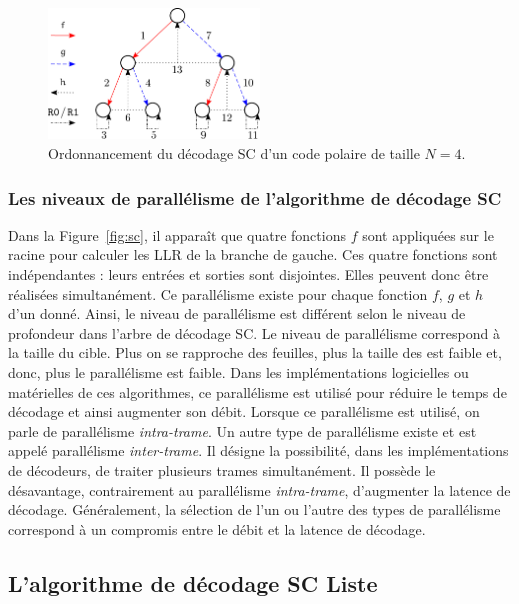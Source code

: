 \begin{figure}[t]
\centering
\includegraphics[width=0.5\textwidth]{main/ch1_fig/seq_sc}
\caption{Ordonnancement du décodage SC d'un code polaire de taille $N=4$.}
\label{fig:seq_sc}
\end{figure}

\subsubsection{Les niveaux de parallélisme de l'algorithme  de décodage SC}
\label{subsubsec:parallel}
Dans la Figure~\ref{fig:sc}, il apparaît que quatre fonctions $f$ sont appliquées sur le \noeud racine pour calculer les LLR de la branche de gauche. Ces quatre fonctions sont indépendantes : leurs entrées et sorties sont disjointes. Elles peuvent donc être réalisées simultanément. Ce parallélisme existe pour chaque fonction $f$, $g$ et $h$ d'un \noeud donné. Ainsi, le niveau de parallélisme est différent selon le niveau de profondeur dans l'arbre de décodage SC. Le niveau de parallélisme correspond à la taille du \noeud cible. Plus on se rapproche des feuilles, plus la taille des \noeuds est faible et, donc, plus le parallélisme est faible. Dans les implémentations logicielles ou matérielles de ces algorithmes, ce parallélisme est utilisé pour réduire le temps de décodage et ainsi augmenter son débit. Lorsque ce parallélisme est utilisé, on parle de parallélisme \textit{intra-trame}. Un autre type de parallélisme existe et est appelé parallélisme \textit{inter-trame}. Il désigne la possibilité, dans les implémentations de décodeurs, de traiter plusieurs trames simultanément. Il possède le désavantage, contrairement au parallélisme \textit{intra-trame}, d'augmenter la latence de décodage. Généralement, la sélection de l'un ou l'autre des types de parallélisme correspond à un compromis entre le débit et la latence de décodage.


\subsection{L'algorithme de décodage SC Liste}
